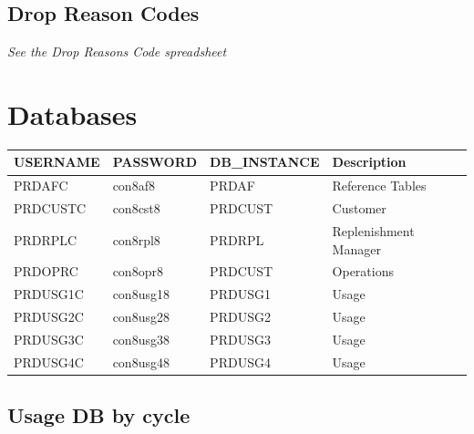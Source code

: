 \documentclass[12pt,twoside]{article}
\begin{document}
\normalsize
\subsection{Drop Reason Codes}
\label{sec-7-5}

   \emph{See the Drop Reasons Code spreadsheet}

\newpage
\section{Databases}
\label{sec-8}


\footnotesize


\begin{center}
\begin{tabular}{llll}
\hline
 \textbf{USERNAME}  &  \textbf{PASSWORD}  &  \textbf{DB\_INSTANCE}  &  \textbf{Description}   \\
\hline
 PRDAFC             &  con8af8            &  PRDAF                  &  Reference Tables       \\
 PRDCUSTC           &  con8cst8           &  PRDCUST                &  Customer               \\
 PRDRPLC            &  con8rpl8           &  PRDRPL                 &  Replenishment Manager  \\
 PRDOPRC            &  con8opr8           &  PRDCUST                &  Operations             \\
 PRDUSG1C           &  con8usg18          &  PRDUSG1                &  Usage                  \\
 PRDUSG2C           &  con8usg28          &  PRDUSG2                &  Usage                  \\
 PRDUSG3C           &  con8usg38          &  PRDUSG3                &  Usage                  \\
 PRDUSG4C           &  con8usg48          &  PRDUSG4                &  Usage                  \\
\hline
\end{tabular}
\end{center}


\normalsize
\subsection{Usage DB by cycle}
\label{sec-8-1}

\footnotesize
\end{document}
